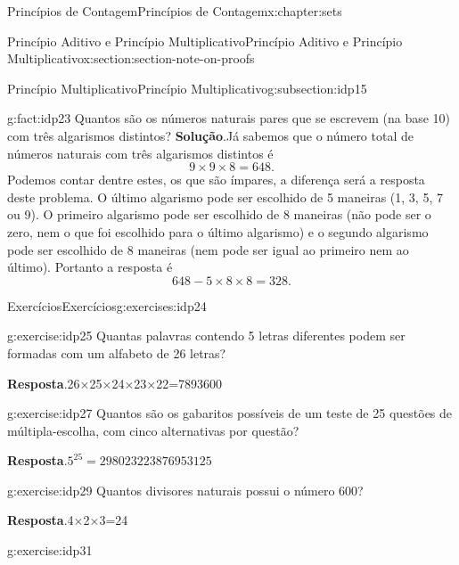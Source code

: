 \documentclass[oneside,10pt,]{book}
\newcommand{\blocktitlefont}{\relax}
\numberwithin{equation}{section}
\begin{document}
\begin{chapterptx}{Princípios de Contagem}{}{Princípios de Contagem}{}{}{x:chapter:sets}
\begin{sectionptx}{Princípio Aditivo e Princípio Multiplicativo}{}{Princípio Aditivo e Princípio Multiplicativo}{}{}{x:section:section-note-on-proofs}
\begin{subsectionptx}{Princípio Multiplicativo}{}{Princípio Multiplicativo}{}{}{g:subsection:idp15}
\begin{fact}{}{}{g:fact:idp23}
Quantos são os números naturais pares que se escrevem (na base 10) com três algarismos distintos?%
\textbf{\blocktitlefont Solução}.\quad{}Já sabemos que o número total de números naturais com três algarismos distintos é%
\begin{equation*}
9\times 9\times 8 = 648. 
\end{equation*}
Podemos contar dentre estes, os que são ímpares, a diferença será a resposta deste problema. O último algarismo pode ser escolhido de 5 maneiras (1, 3, 5, 7 ou 9). O primeiro algarismo pode ser escolhido de 8 maneiras (não pode ser o zero, nem o que foi escolhido para o último algarismo) e o segundo algarismo pode ser escolhido de 8 maneiras (nem pode ser igual ao primeiro nem ao último). Portanto a resposta é%
%
\begin{equation*}
648 - 5\times 8\times 8=328. 
\end{equation*}
%
\end{fact}
\end{subsectionptx}
%
%
\typeout{************************************************}
\typeout{************************************************}
%
\begin{exercises-subsection}{Exercícios}{}{Exercícios}{}{}{g:exercises:idp24}
\begin{divisionexercise}{1}{}{}{g:exercise:idp25}%
Quantas palavras contendo 5 letras diferentes podem ser formadas com um alfabeto de 26 letras?%
\par\smallskip%
\noindent\textbf{\blocktitlefont Resposta}.\hypertarget{g:answer:idp26}{}\quad{}26×25×24×23×22=7893600%
\end{divisionexercise}%
\begin{divisionexercise}{2}{}{}{g:exercise:idp27}%
Quantos são os gabaritos possíveis de um teste de 25 questões de múltipla-escolha, com cinco alternativas por questão?%
\par\smallskip%
\noindent\textbf{\blocktitlefont Resposta}.\hypertarget{g:answer:idp28}{}\quad{}\(5^{25}=298023223876953125\)%
\end{divisionexercise}%
\begin{divisionexercise}{3}{}{}{g:exercise:idp29}%
Quantos divisores naturais possui o número 600?%
\par\smallskip%
\noindent\textbf{\blocktitlefont Resposta}.\hypertarget{g:answer:idp30}{}\quad{}4×2×3=24%
\end{divisionexercise}%
\begin{divisionexercise}{4}{}{}{g:exercise:idp31}%

\end{divisionexercise}
\end{exercises-subsection}
\end{sectionptx}
\end{chapterptx}
\end{document}
